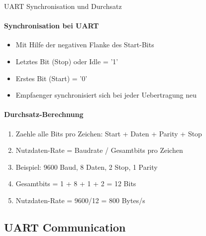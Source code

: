 \begin{KR}{UART Synchronisation und Durchsatz}\\
    \paragraph{Synchronisation bei UART}
    \begin{itemize}
        \item Mit Hilfe der negativen Flanke des Start-Bits
        \item Letztes Bit (Stop) oder Idle = '1'
        \item Erstes Bit (Start) = '0'
        \item Empfaenger synchronisiert sich bei jeder Uebertragung neu
    \end{itemize}
    
    \paragraph{Durchsatz-Berechnung}
    \begin{enumerate}
        \item Zaehle alle Bits pro Zeichen: Start + Daten + Parity + Stop
        \item Nutzdaten-Rate = Baudrate / Gesamtbits pro Zeichen
        \item Beispiel: 9600 Baud, 8 Daten, 2 Stop, 1 Parity
        \item Gesamtbits = 1 + 8 + 1 + 2 = 12 Bits
        \item Nutzdaten-Rate = 9600/12 = 800 Bytes/s
    \end{enumerate}
\end{KR}

\subsection{UART Communication}

